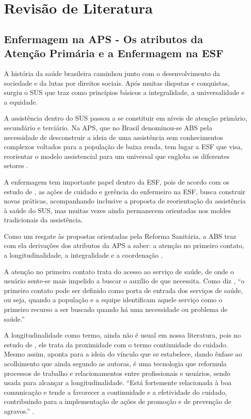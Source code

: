 \section{Revisão de Literatura}
\label{sec:revisao}

\subsection{Enfermagem na APS - Os atributos da Atenção Primária e a Enfermagem na ESF}

A história da saúde brasileira caminhou junto com o desenvolvimento da sociedade e da lutas por direitos sociais. Após muitas disputas e conquistas, surgiu o \acrshort{SUS} que traz como princípios básicos a integralidade, a universalidade e a equidade. 

A assistência dentro do \acrshort{SUS} passou a se constituir em níveis de atenção primário, secundário e terciário. Na \acrshort{APS}, que no Brasil denominou-se \acrlong{ABS} pela necessidade de desconstruir a ideia de uma assistência sem conhecimentos complexos voltados para a população de baixa renda, tem lugar a \acrlong{ESF} que visa, reorientar o modelo assistencial para um universal que engloba os diferentes setores \cite{oliveira2013atributos}.

A enfermagem tem importante papel dentro da \acrshort{ESF}, pois de acordo com os estudo de \cite{fernandes2013gerencia}, as ações de cuidado e gerência do enfermeiro na \acrshort{ESF}, busca construir novas práticas, acompanhando inclusive a proposta de reorientação da assistência à saúde do \acrshort{SUS}, mas muitas vezes ainda permanecem orientadas nos moldes tradicionais da assistência. 

Como um resgate às propostas orientadas pela Reforma Sanitária, a \acrshort{ABS} traz com ela derivações dos atributos da \acrshort{APS} a saber: a atenção no primeiro contato, a longitudinalidade, a integralidade e a coordenação \cite{oliveira2013atributos}.

A atenção no primeiro contato trata do acesso ao serviço de saúde, de onde o usuário sente-se mais impelido a buscar o auxílio de que necessita. Como diz \cite{oliveira2013atributos}, ``o primeiro contato pode ser definido como porta de entrada dos serviços de saúde, ou seja, quando a população e a equipe identificam aquele serviço como o primeiro recurso a ser buscado quando há uma necessidade ou problema de saúde.''

A longitudinalidade como termo, ainda não é usual em nossa literatura, pois no estudo de \cite{cunha2011longitudinalidade}, ele trata da proximidade com o termo continuidade do cuidado. Mesmo assim, aponta para a ideia do vínculo que se estabelece, dando ênfase ao acolhimento que ainda segundo as autoras, é uma tecnologia que reformula processos de trabalho e relacionamentos  entre profissionais e usuários, sendo usada para alcançar a longitudinalidade. ``Está fortemente relacionada à boa comunicação e tende a favorecer a continuidade e a efetividade do cuidado, contribuindo para a implementação de ações de promoção e de prevenção de agravos.'' \cite{cunha2011longitudinalidade}. 

